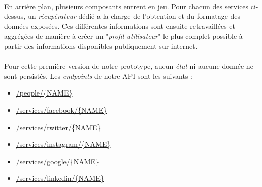 \paragraph{} En arrière plan, plusieurs composants entrent en jeu. Pour chacun des services
ci-dessus, un \emph{récupérateur} dédié a la charge de l'obtention et du formatage des données
exposées. Ces différentes informations sont ensuite retravaillées et aggrégées de manière 
à créer un "\emph{profil utilisateur}" le plus complet possible à partir des informations
disponibles publiquement sur internet.

\paragraph{} Pour cette première version de notre prototype, aucun \emph{état} ni aucune
donnée ne sont persistés. Les \emph{endpoints} de notre API sont les suivants :

\begin{itemize}
    \item \url{/people/{NAME}}
    \item \url{/services/facebook/{NAME}}
    \item \url{/services/twitter/{NAME}}
    \item \url{/services/instagram/{NAME}}
    \item \url{/services/google/{NAME}}
    \item \url{/services/linkedin/{NAME}}
\end{itemize}